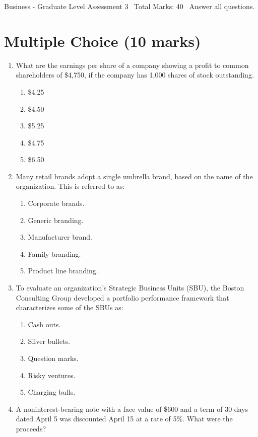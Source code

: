 \documentclass[12pt]{article}
\begin{document}
\begin{center}
Business - Graduate Level Assessment 3 \
Total Marks: 40 \
Answer all questions.
\end{center}

\section*{Multiple Choice (10 marks)}
\begin{enumerate}[label=\arabic*.]
\item What are the earnings per share of a company showing a profit to common shareholders of
\$4,750, if the company has 1,000 shares of stock outstanding.
\begin{enumerate}[label=(\alph*)]
    \item \$4.25
    \item \$4.50
    \item \$5.25
    \item \$4.75
    \item \$6.50
\end{enumerate}
\item Many retail brands adopt a single umbrella brand, based on the name of the organization.
This is referred to as:
\begin{enumerate}[label=(\alph*)]
    \item Corporate brands.
    \item Generic branding.
    \item Manufacturer brand.
    \item Family branding.
    \item Product line branding.
\end{enumerate}
\item To evaluate an organization's Strategic Business Units (SBU), the Boston Consulting Group
developed a portfolio performance framework that characterizes some of the SBUs as:
\begin{enumerate}[label=(\alph*)]
    \item Cash outs.
    \item Silver bullets.
    \item Question marks.
    \item Risky ventures.
    \item Charging bulls.
\end{enumerate}
\item A noninterest-bearing note with a face value of \$600 and a term of 30 days dated April 5
was discounted April 15 at a rate of 5\%. What were the proceeds?

\end{enumerate}
\end{document}
